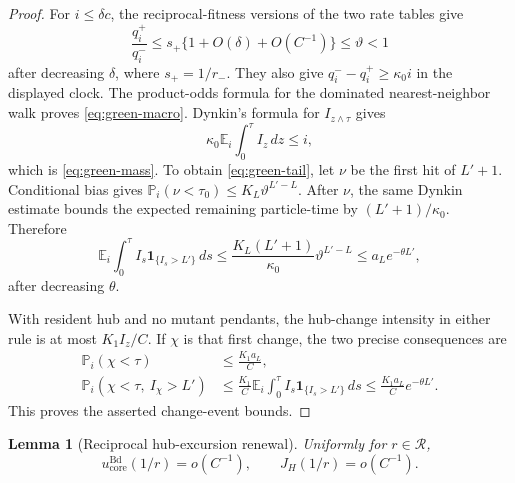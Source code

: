 \documentclass[11pt]{article}
\newtheorem{lemma}[theorem]{Lemma}
\theoremstyle{definition}
\theoremstyle{remark}
\newcommand{\Bd}{\mathrm{Bd}}
\newcommand{\Prob}{\mathbb P}
\begin{document}
\begin{proof}
For $i\leq\delta c$, the reciprocal-fitness versions of the two rate tables
give
\[
 \frac{q_i^+}{q_i^-}\leq s_+\{1+O(\delta)+O(C^{-1})\}\leq\vartheta<1
\]
after decreasing $\delta$, where $s_+=1/r_-$.  They also give
$q_i^--q_i^+\geq\kappa_0i$ in the displayed clock.  The product-odds formula
for the dominated nearest-neighbor walk proves \eqref{eq:green-macro}.
Dynkin's formula for $I_{z\wedge\tau}$ gives
\[
 \kappa_0\mathbb E_i\int_0^\tau I_z\,dz\leq i,
\]
which is \eqref{eq:green-mass}.  To obtain \eqref{eq:green-tail}, let $\nu$
be the first hit of $L'+1$.  Conditional bias gives
$\Prob_i(\nu<\tau_0)\leq K_L\vartheta^{L'-L}$.  After $\nu$, the same Dynkin
estimate bounds the expected remaining particle-time by
$(L'+1)/\kappa_0$.  Therefore
\[
 \mathbb E_i\int_0^\tau I_s\mathbf1_{\{I_s>L'\}}\,ds
 \leq \frac{K_L(L'+1)}{\kappa_0}\vartheta^{L'-L}
 \leq a_Le^{-\theta L'},
\]
after decreasing $\theta$.

With resident hub and no mutant pendants, the hub-change intensity in either
rule is at most $K_1I_z/C$.  If $\chi$ is that first change, the two precise
consequences are
\begin{align}
 \Prob_i(\chi<\tau)&\leq \frac{K_1a_L}{C},\label{eq:green-hub-change}\\
 \Prob_i(\chi<\tau,\ I_\chi>L')
 &\leq\frac{K_1}{C}\mathbb E_i\int_0^\tau
 I_s\mathbf1_{\{I_s>L'\}}\,ds
 \leq\frac{K_1a_L}{C}e^{-\theta L'}.
\label{eq:green-hub-tail}
\end{align}
This proves the asserted change-event bounds.
\end{proof}

\begin{lemma}[Reciprocal hub-excursion renewal]
\label{lem:reciprocal-renewal}
Uniformly for $r\in\mathcal R$,
\[
 u_{\mathrm{core}}^{\Bd}(1/r)=o(C^{-1}),\qquad
 J_H(1/r)=o(C^{-1}).
\]
\end{lemma}
\end{document}
